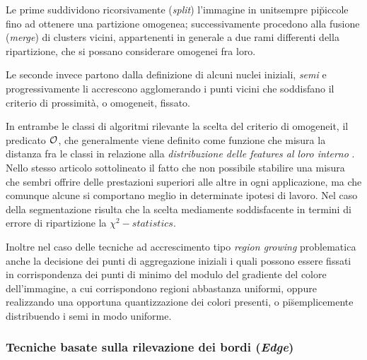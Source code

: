 Le prime suddividono ricorsivamente ({\it split}) l'immagine in unit\a sempre pi\u piccole
fino ad ottenere una partizione omogenea; successivamente procedono alla
fusione ({\it merge}) di clusters vicini, appartenenti in generale a due rami differenti
della ripartizione, che si possano considerare omogenei fra loro.

Le seconde invece partono dalla definizione di alcuni nuclei iniziali, {\it semi} e
progressivamente li accrescono agglomerando i punti vicini che soddisfano il criterio
di prossimit\`a, o omogeneit\a, fissato.

In entrambe le classi di algoritmi \e rilevante la scelta del criterio
di omogeneit\a, il predicato $\cal O$, che generalmente viene definito come 
funzione che misura la distanza fra le classi in relazione alla {\it distribuzione delle
features al loro interno} \cite{Puzicha}.
Nello stesso articolo \e sottolineato il fatto che non \e possibile stabilire una
misura che sembri offrire delle prestazioni superiori alle altre in ogni applicazione,
ma che comunque alcune si comportano meglio in determinate ipotesi di lavoro.
Nel caso della segmentazione risulta che la scelta mediamente  soddisfacente
in termini di errore di ripartizione \e la $\chi^2-statistics$.

Inoltre nel caso delle tecniche ad accrescimento tipo {\it region growing} \e problematica
anche la decisione dei punti di aggregazione iniziali i quali possono essere fissati
in corrispondenza dei punti di minimo del modulo del gradiente del colore dell'immagine, a cui
corrispondono regioni abbastanza uniformi, oppure realizzando una opportuna quantizzazione
dei colori presenti, o pi\u semplicemente distribuendo i semi in modo uniforme.

\subsubsection{Tecniche basate sulla rilevazione dei bordi ({\it Edge})}

